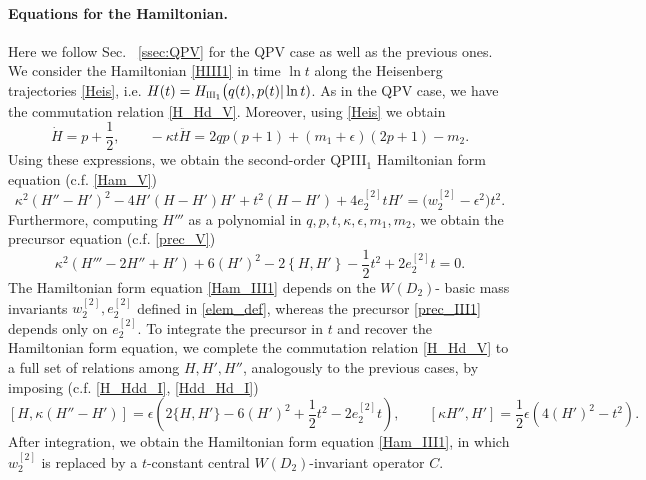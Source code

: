 \documentclass[12pt,a4paper]{article}
\numberwithin{equation}{section}
\newcommand{\III}{\scalebox{.6}{III}}
\begin{document}
\paragraph{Equations for the Hamiltonian.}
Here we follow Sec.~ \ref{ssec:QPV} for the QPV case as well as the previous ones. We consider the Hamiltonian \eqref{HIII1} in time $\ln t$ along the Heisenberg  trajectories \eqref{Heis}, i.e.  
$H(t)=H_{\III_1}\big(q(t),p(t)|\ln t)$. As in the QPV case, we have the commutation relation \eqref{H_Hd_V}. Moreover, using \eqref{Heis} we obtain
\begin{equation}\label{Hder_III1}
\dot{H}=p+\frac12,\qquad -\kappa t\ddot{H}=2qp(p{+}1)+(m_1{+}\epsilon)(2p+1)-m_2.   
\end{equation}
Using these expressions, we obtain the second-order 
QPIII$_1$ Hamiltonian form equation (c.f. \eqref{Ham_V})
\begin{equation}
\label{Ham_III1}
\kappa^2(H''-H')^2-4H'(H-H')H'+t^2(H-H')+4e_2^{[2]}tH'=\big(w_2^{[2]}{-}\epsilon^2\big)t^2.
\end{equation}
Furthermore, computing $H'''$ as a polynomial in $q,p,t,\kappa,\epsilon,m_1,m_2$, we obtain the precursor equation (c.f. \eqref{prec_V})
\begin{equation}\label{prec_III1}
\kappa^2(H'''-2H''+H')+6(H')^2-2\left\{H,H'\right\}-\frac12t^2+2e_2^{[2]}t=0. 
\end{equation}
The Hamiltonian form equation \eqref{Ham_III1} depends on the $W(D_2)$- basic mass invariants $w_2^{[2]},e_2^{[2]}$ defined in \eqref{elem_def}, whereas the precursor \eqref{prec_III1} depends only on $e_2^{[2]}$. 
To integrate the precursor in $t$ and recover the Hamiltonian form equation, we complete the commutation relation \eqref{H_Hd_V} to a full set of relations among $H,H',H''$, analogously to the previous cases, by imposing (c.f. \eqref{H_Hdd_I}, \eqref{Hdd_Hd_I}) 
\begin{equation}\label{triple_III1}
[H,\kappa (H''{-}H')]=\epsilon\left(2\{H,H'\}-6(H')^2+\frac12t^2-2e_2^{[2]}t\right), \qquad [\kappa H'',H']=\frac12\epsilon\left(4(H')^2{-}t^2\right).
\end{equation}
After integration, we obtain the Hamiltonian form equation \eqref{Ham_III1}, in which $w_2^{[2]}$ is replaced by a $t$-constant central $W(D_2)$-invariant operator $C$. 
\end{document}
